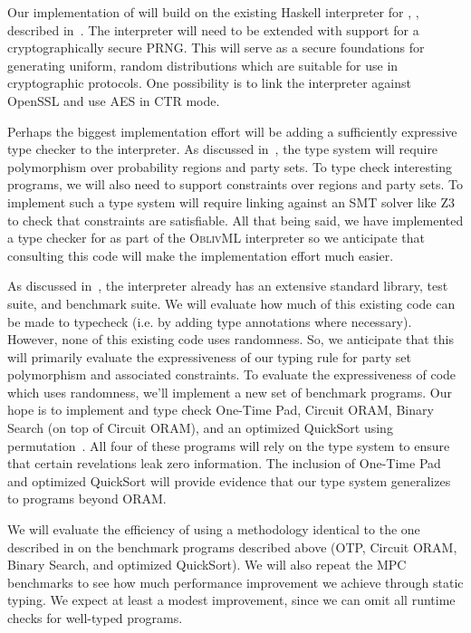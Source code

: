 Our implementation of \lang will build on the existing Haskell interpreter for \mpc, \system, described in~.
The interpreter will need to be extended with support for a cryptographically secure PRNG. This will serve as a secure foundations for
generating uniform, random distributions which are suitable for use in cryptographic protocols. One possibility is to link the interpreter
against OpenSSL and use AES in CTR mode.

Perhaps the biggest implementation effort will be adding a sufficiently expressive type checker to the interpreter. As discussed
in~, the type system will require polymorphism over probability regions and party sets. To
type check interesting programs, we will also need to support constraints over regions and party sets. To implement such a type system
will require linking against an SMT solver like Z3~\cite{} to check that constraints are satisfiable. All that being said, we have
implemented a type checker for \obliv as part of the \textsc{OblivML} interpreter so we anticipate that consulting this code
will make the implementation effort much easier.

As discussed in~, the \system interpreter already has an extensive standard library, test suite, and benchmark
suite. We will evaluate how much of this existing \system code can be made to typecheck (i.e. by adding type annotations where necessary).
However, none of this existing code uses randomness. So, we anticipate that this will primarily evaluate the expressiveness of our
typing rule for party set polymorphism and associated constraints. To evaluate the expressiveness of code which uses randomness,
we'll implement a new set of benchmark programs. Our hope is to implement and type check One-Time Pad, Circuit ORAM,
Binary Search (on top of Circuit ORAM), and an optimized QuickSort using permutation~\cite{hamada}. All four of these programs
will rely on the type system to ensure that certain revelations leak zero information. The inclusion of One-Time
Pad and optimized QuickSort will provide evidence that our type system generalizes to programs beyond ORAM.

We will evaluate the efficiency of \lang using a methodology identical to the one described in  on the
benchmark programs described above (OTP, Circuit ORAM, Binary Search, and optimized QuickSort). We will also repeat the MPC
benchmarks to see how much performance improvement we achieve through static typing. We expect at least a modest improvement,
since we can omit all runtime checks for well-typed programs.
